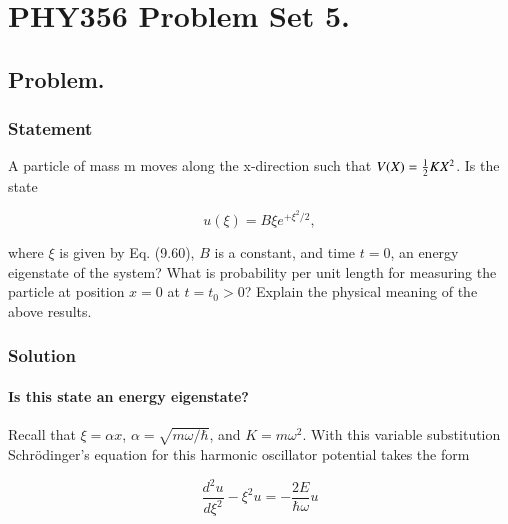 %
%
%
%
%

\chapter{PHY356 Problem Set 5.}
\label{chap:qmIproblemSet5}
\date{Nov 25, 2010}

\beginArtNoToc

\section{Problem.}
\subsection{Statement}

A particle of mass m moves along the x-direction such that $V(X)=\frac{1}{2}KX^2$. Is the state 

\begin{equation}\label{eqn:qmIproblemSet5:5}
u(\xi) = B \xi e^{+\xi^2/2},
\end{equation}

where $\xi$ is given by Eq. (9.60), $B$ is a constant, and time $t=0$, an energy eigenstate of the system?  What is probability per unit length for measuring the particle at position $x=0$ at $t=t_0>0$?  Explain the physical meaning of the above results.

\subsection{Solution}
\subsubsection{Is this state an energy eigenstate?}

Recall that $\xi = \alpha x$, $\alpha = \sqrt{m\omega/\hbar}$, and $K = m \omega^2$.  With this variable substitution Schr\"{o}dinger's equation for this harmonic oscillator potential takes the form

\begin{equation}\label{eqn:qmIproblemSet5:10}
\frac{d^2 u}{d\xi^2} - \xi^2 u = -\frac{2 E }{\hbar\omega} u
\end{equation}

